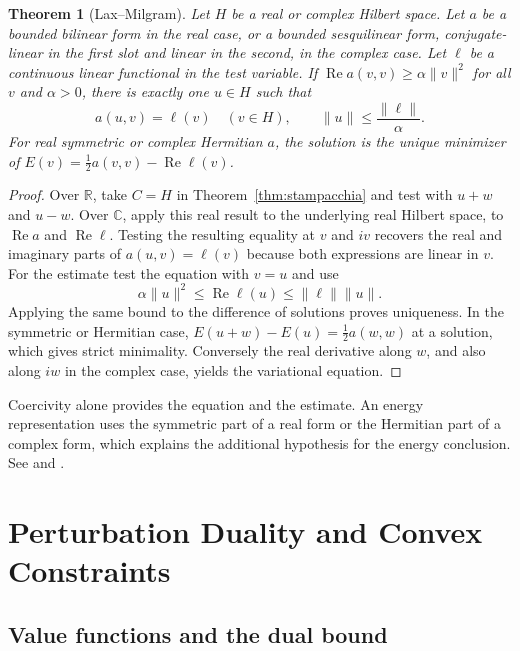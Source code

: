 \documentclass[11pt,oneside,openany]{book}
\theoremstyle{plain}
\newtheorem{theorem}{Theorem}[chapter]
\theoremstyle{definition}
\theoremstyle{remark}
\begin{document}
\begin{theorem}[Lax--Milgram]
\label{thm:lax-milgram}
Let \(H\) be a real or complex Hilbert space. Let \(a\) be a bounded
bilinear form in the real case, or a bounded sesquilinear form,
conjugate-linear in the first slot and linear in the second, in the
complex case. Let \(\ell\) be a continuous linear functional in the
test variable. If
\(\operatorname{Re} a(v,v)\ge\alpha\|v\|^2\) for all \(v\) and
\(\alpha>0\), there is exactly one \(u\in H\) such that
\[
 a(u,v)=\ell(v)\quad(v\in H),\qquad
 \|u\|\le \frac{\|\ell\|}{\alpha}.
\]
For real symmetric or complex Hermitian \(a\), the solution is the
unique minimizer of
\(E(v)=\tfrac12 a(v,v)-\operatorname{Re}\ell(v)\).
\end{theorem}
\begin{proof}
Over \(\mathbb R\), take \(C=H\) in Theorem~\ref{thm:stampacchia}
and test with \(u+w\) and \(u-w\). Over \(\mathbb C\), apply this
real result to the underlying real Hilbert space, to
\(\operatorname{Re}a\) and \(\operatorname{Re}\ell\).
Testing the resulting equality at \(v\) and \(iv\) recovers the real
and imaginary parts of \(a(u,v)=\ell(v)\) because both expressions
are linear in \(v\). For the estimate test the equation with \(v=u\)
and use
\[
 \alpha\|u\|^2\le\operatorname{Re}\ell(u)\le\|\ell\|\|u\|.
\]
Applying the same bound to the difference of solutions proves
uniqueness. In the symmetric or Hermitian case,
\(E(u+w)-E(u)=\frac12 a(w,w)\) at a solution, which gives strict
minimality. Conversely the real derivative along \(w\), and also along
\(iw\) in the complex case, yields the variational equation.
\end{proof}

Coercivity alone provides the equation and the estimate. An energy
representation uses the symmetric part of a real form or the
Hermitian part of a complex form, which explains the additional
hypothesis for the energy conclusion. See
\cite[Corollary 5.8]{Brezis} and
\cite[Chapter II, Section 3]{EkelandTemam}.
\chapter{Perturbation Duality and Convex Constraints}

\section{Value functions and the dual bound}
\label{v04-01}
\end{document}

